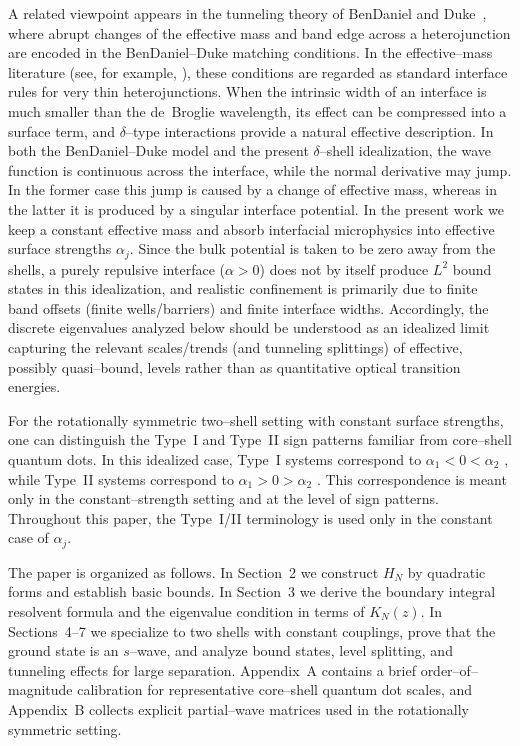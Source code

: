 \documentclass[a4paper,11pt]{article}
\numberwithin{equation}{section}
\theoremstyle{definition}
\theoremstyle{remark}
\begin{document}
A related viewpoint appears in the tunneling theory of BenDaniel and Duke~\cite{BenDanielDuke},
where abrupt changes of the effective mass and band edge across a heterojunction
are encoded in the BenDaniel--Duke matching conditions.
In the effective--mass literature (see, for example, \cite{HarrisonQWWD4}), these
conditions are regarded as standard interface rules for very thin heterojunctions.
When the intrinsic width of an interface is much smaller than the de~Broglie
wavelength, its effect can be compressed into a surface term, and $\delta$--type
interactions provide a natural effective description.
In both the BenDaniel--Duke
model and the present $\delta$--shell idealiza\-tion, the wave function is continuous
across the interface, while the normal derivative may jump. In the former
case this jump is caused by a change of effective mass, whereas in the latter
it is produced by a singular interface potential. In the present work we keep
a constant effective mass and absorb interfacial microphysics into effective
surface strengths $\alpha_j$.
Since the bulk potential is taken to be zero away from the shells, a purely
repulsive interface ($\alpha>0$) does not by itself produce $L^2$ bound states in this idealization,
and realistic confinement is primarily due to finite band offsets (finite wells/barriers) and finite interface widths.
Accordingly, the discrete eigenvalues analyzed below should be understood as an idealized limit capturing the relevant scales/trends (and tunneling splittings) of effective, possibly quasi--bound, levels rather than as quantitative optical transition energies.

For the rotationally symmetric two--shell setting with constant surface
strengths, one can distinguish the Type~I and Type~II sign patterns familiar
from core--shell quantum dots.
In this idealized case, Type~I systems correspond to $\alpha_1<0<\alpha_2$
\cite{HinesGuyotSionnest1996}, while Type~II systems correspond to
$\alpha_1>0>\alpha_2$ \cite{OronKazesBanin2007}.
This correspondence is meant only in the constant--strength setting and at the level of sign patterns.
Throughout this paper, the Type~I/II terminology is used only in the constant
case of $\alpha_j$.

The paper is organized as follows.
In Section~2 we construct $H_N$ by quadratic forms and establish basic bounds.
In Section~3 we derive the boundary integral resolvent formula and the
eigenvalue condition in terms of $K_N(z)$.
In Sections~4--7 we specialize to two shells with constant couplings, prove
that the ground state is an $s$--wave, and analyze bound states, level splitting,
and tunneling effects for large separation.
Appendix~A contains a brief order--of--magnitude calibration for representative
core--shell quantum dot scales, and Appendix~B collects explicit partial--wave
matrices used in the rotationally symmetric setting.
\end{document}
